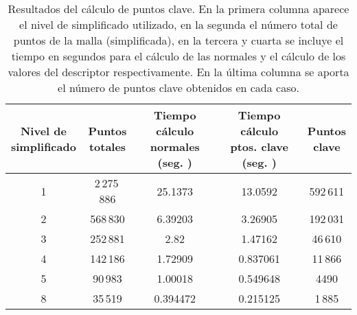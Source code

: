 \begin{table}[h!]
	\centering
	\begin{tabular}{| c | c | c | c | c |} 
		\hline
		\thead{Nivel de\\ simplificado} & \thead{Puntos \\ totales}  & \thead{Tiempo cálculo \\normales (seg. )} & \thead{Tiempo cálculo \\ptos. clave (seg. )} & \thead{Puntos \\ clave} \\
		\hline
		1 & 2\,275\,886 & 25.1373 & 13.0592 & 592\,611 \\			 
		2 & 568\,830 & 6.39203  &  3.26905 & 192\,031 \\
		3 & 252\,881 & 2.82 &  1.47162 & 46\,610 \\
		4 &  142\,186 &  1.72909 &  0.837061 & 11\,866\\
		5 & 90\,983 & 1.00018 & 0.549648 & 4490 \\
		8 & 35\,519 &   0.394472 &   0.215125 &  1\,885\\
		\hline
	\end{tabular}
	\caption{Resultados del cálculo de puntos clave. En la primera columna aparece el nivel de simplificado utilizado, en la segunda el número total de puntos de la malla (simplificada), en la tercera y cuarta se incluye el tiempo en segundos para el cálculo de las normales y el cálculo de los valores del descriptor respectivamente. En la última columna se aporta el número de puntos clave obtenidos en cada caso. }
	\label{table:desNormales}
\end{table}

